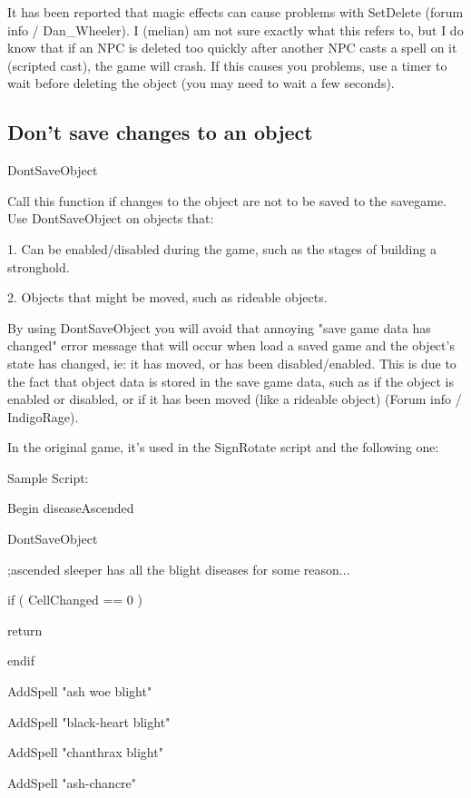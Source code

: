 \documentclass[
]{article}
\begin{document}
It has been reported that magic effects can cause problems with
SetDelete (forum info / Dan\_Wheeler). I (melian) am not sure exactly
what this refers to, but I do know that if an NPC is deleted too quickly
after another NPC casts a spell on it (scripted cast), the game will
crash. If this causes you problems, use a timer to wait before deleting
the object (you may need to wait a few seconds).

\hypertarget{dont-save-changes-to-an-object}{%
\subsection{\texorpdfstring{\hfill\break
Don't save changes to an
object}{ Don't save changes to an object}}\label{dont-save-changes-to-an-object}}

DontSaveObject

Call this function if changes to the object are not to be saved to the
savegame.\\
Use DontSaveObject on objects that:

1. Can be enabled/disabled during the game, such as the stages of
building a stronghold.

2. Objects that might be moved, such as rideable objects.

By using DontSaveObject you will avoid that annoying "save game data has
changed" error message that will occur when load a saved game and the
object's state has changed, ie: it has moved, or has been
disabled/enabled. This is due to the fact that object data is stored in
the save game data, such as if the object is enabled or disabled, or if
it has been moved (like a rideable object) (Forum info / IndigoRage).

In the original game, it's used in the SignRotate script and the
following one:

Sample Script:

Begin diseaseAscended

DontSaveObject

;ascended sleeper has all the blight diseases for some reason...

if ( CellChanged == 0 )

return

endif

AddSpell "ash woe blight"

AddSpell "black-heart blight"

AddSpell "chanthrax blight"

AddSpell "ash-chancre"
\end{document}
